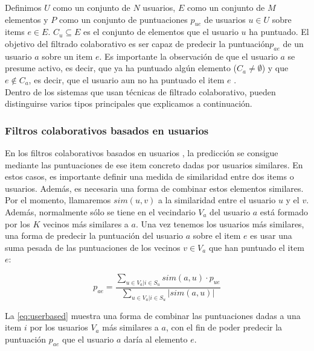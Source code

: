 Definimos $U$ como un conjunto de $N$ usuarios, $E$ como un conjunto de $M$ elementos y $P$ como un conjunto de puntuaciones $p_{ue}$ de usuarios $u\in U$ sobre items $e\in E$. $C_u \subseteq E$ es el conjunto de elementos que el usuario $u$ ha puntuado. El objetivo del filtrado colaborativo es ser capaz de predecir la puntuación$p_{ae}$ de un usuario $a$ sobre un item $e$. Es importante la observación de que el usuario $a$ se presume activo, es decir, que ya ha puntuado algún elemento ($C_a \neq \emptyset$) y que $e \notin C_a$, es decir, que el usuario aun no ha puntuado el item $e$ .\\

Dentro de los sistemas que usan técnicas de filtrado colaborativo, pueden distinguirse varios tipos principales que explicamos a continuación.

\subsubsection{Filtros colaborativos basados en usuarios}

En los filtros colaborativos basados en usuarios \cite{resnick}, la predicción se consigue mediante las puntuaciones de ese item concreto dadas por usuarios similares. En estos casos, es importante definir una medida de similaridad entre dos items o usuarios. Además, es necesaria una forma de combinar estos elementos similares. \\

Por el momento, llamaremos $sim\left(u, v\right)$ a la similaridad entre el usuario $u$ y el $v$. Además, normalmente sólo se tiene en el vecindario $V_a$ del usuario $a$ está formado por los $K$ vecinos más similares a $a$. Una vez tenemos los usuarios más similares, una forma de predecir la puntuación del usuario $a$ sobre el item $e$ es usar una suma pesada de las puntuaciones de los vecinos $v\in V_a$ que han puntuado el item $e$:

\begin{equation}
    p_{ae} = \frac{\sum_{u\in V_a | i \in S_u}{sim\left(a, u\right)\cdot p_{ue}}}{\sum_{u\in V_a | i \in S_u}{|sim\left(a, u\right)|}}
\label{eq:userbased}
\end{equation}

La \autoref{eq:userbased} muestra una forma de combinar las puntuaciones dadas a una item $i$ por los usuarios $V_a$ más similares a $a$, con el fin de poder predecir la puntuación $p_{ae}$ que el usuario $a$ daría al elemento $e$.\\

